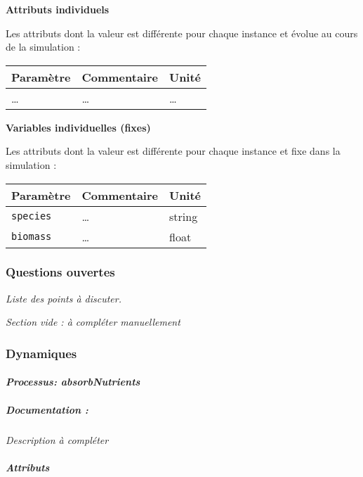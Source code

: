 \documentclass[
]{article}
\begin{document}
\textbf{Attributs individuels}

Les attributs dont la valeur est différente pour chaque instance et
évolue au cours de la simulation :

\begin{longtable}[]{@{}lll@{}}
\toprule\noalign{}
\textbf{Paramètre} & \textbf{Commentaire} & \textbf{Unité} \\
\midrule\noalign{}
\endhead
\bottomrule\noalign{}
\endlastfoot
\ldots{} & \ldots{} & \ldots{} \\
\end{longtable}

\textbf{Variables individuelles (fixes)}

Les attributs dont la valeur est différente pour chaque instance et fixe
dans la simulation :

\begin{longtable}[]{@{}lll@{}}
\toprule\noalign{}
\textbf{Paramètre} & \textbf{Commentaire} & \textbf{Unité} \\
\midrule\noalign{}
\endhead
\bottomrule\noalign{}
\endlastfoot
\texttt{species} & \ldots{} & string \\
\texttt{biomass} & \ldots{} & float \\
\end{longtable}

\subsubsection{Questions ouvertes}\label{questions-ouvertes-5}

\emph{Liste des points à discuter.}

\emph{Section vide : à compléter manuellement}

\subsubsection{Dynamiques}\label{dynamiques-5}

\paragraph{\texorpdfstring{\emph{Processus:
absorbNutrients}}{Processus: absorbNutrients}}\label{processus-absorbnutrients}

\subparagraph{Documentation :}\label{documentation-9}

\emph{Description à compléter}

\subparagraph{Attributs}\label{attributs-9}
\end{document}
